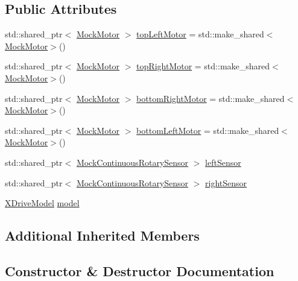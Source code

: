 \subsection*{Public Attributes}
\begin{DoxyCompactItemize}
\item 
std\+::shared\+\_\+ptr$<$ \mbox{\hyperlink{classokapi_1_1MockMotor}{Mock\+Motor}} $>$ \mbox{\hyperlink{classXDriveModelTest_a2182fc3a274ac63052a3849e53faaea9}{top\+Left\+Motor}} = std\+::make\+\_\+shared$<$\mbox{\hyperlink{classokapi_1_1MockMotor}{Mock\+Motor}}$>$()
\item 
std\+::shared\+\_\+ptr$<$ \mbox{\hyperlink{classokapi_1_1MockMotor}{Mock\+Motor}} $>$ \mbox{\hyperlink{classXDriveModelTest_a408390fd11ea1979cc0316ab1dcf26c2}{top\+Right\+Motor}} = std\+::make\+\_\+shared$<$\mbox{\hyperlink{classokapi_1_1MockMotor}{Mock\+Motor}}$>$()
\item 
std\+::shared\+\_\+ptr$<$ \mbox{\hyperlink{classokapi_1_1MockMotor}{Mock\+Motor}} $>$ \mbox{\hyperlink{classXDriveModelTest_abc9ede36f43071f8ce33e5f4f48eadaf}{bottom\+Right\+Motor}} = std\+::make\+\_\+shared$<$\mbox{\hyperlink{classokapi_1_1MockMotor}{Mock\+Motor}}$>$()
\item 
std\+::shared\+\_\+ptr$<$ \mbox{\hyperlink{classokapi_1_1MockMotor}{Mock\+Motor}} $>$ \mbox{\hyperlink{classXDriveModelTest_a4bcc775b3d7aecc07f81855b2571a8c5}{bottom\+Left\+Motor}} = std\+::make\+\_\+shared$<$\mbox{\hyperlink{classokapi_1_1MockMotor}{Mock\+Motor}}$>$()
\item 
std\+::shared\+\_\+ptr$<$ \mbox{\hyperlink{classokapi_1_1MockContinuousRotarySensor}{Mock\+Continuous\+Rotary\+Sensor}} $>$ \mbox{\hyperlink{classXDriveModelTest_aa7f4b9d84586f5d7f61a4539ac68b2c3}{left\+Sensor}}
\item 
std\+::shared\+\_\+ptr$<$ \mbox{\hyperlink{classokapi_1_1MockContinuousRotarySensor}{Mock\+Continuous\+Rotary\+Sensor}} $>$ \mbox{\hyperlink{classXDriveModelTest_a4b6d557c5c88292bfee408955493af0f}{right\+Sensor}}
\item 
\mbox{\hyperlink{classokapi_1_1XDriveModel}{X\+Drive\+Model}} \mbox{\hyperlink{classXDriveModelTest_afb6c8fd3f9a6b03c3c1de42e5c9ff567}{model}}
\end{DoxyCompactItemize}
\subsection*{Additional Inherited Members}


\subsection{Constructor \& Destructor Documentation}
\mbox{\label{classXDriveModelTest_a0d14f77c90990bc3be6aa40e0a08e9fd}} 
